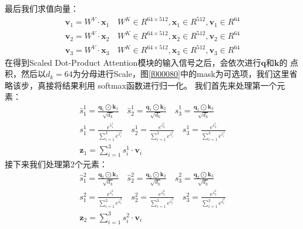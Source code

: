 \documentclass{article}
\begin{document}
最后我们求值向量：
\begin{equation}
\begin{aligned}
\boldsymbol{v}_{1} = W^{V} \cdot \boldsymbol{x}_1 \quad W^{K} \in R^{64 \times 512}, 
\boldsymbol{x}_1 \in R^{512}, \boldsymbol{v}_1 \in R^{64} \\
\boldsymbol{v}_{2} = W^{V} \cdot \boldsymbol{x}_2 \quad W^{K} \in R^{64 \times 512}, 
\boldsymbol{x}_2 \in R^{512}, \boldsymbol{v}_2 \in R^{64} \\
\boldsymbol{v}_{3} = W^{V} \cdot \boldsymbol{x}_3 \quad W^{K} \in R^{64 \times 512}, 
\boldsymbol{x}_3 \in R^{512}, \boldsymbol{v}_3 \in R^{64} 
\end{aligned}
\label{e000108}
\end{equation}
在得到Scaled Dot-Product Attention模块的输入信号之后，会依次进行$\boldsymbol{q}$和$\boldsymbol{k}$的
点积，然后以$d_{k}=64$为分母进行Scale，图\ref{f000080}中的mask为可选项，我们这里省略该步，真接将结果利用
softmax函数进行归一化。
我们首先来处理第一个元素：
\begin{equation}
\begin{aligned}
\hat{s}_{1}^{1} = \frac{ \boldsymbol{q}_1 \bigodot \boldsymbol{k}_1 }{ \sqrt{d_{k}} } \quad 
\hat{s}_{2}^{1} = \frac{ \boldsymbol{q}_1 \bigodot \boldsymbol{k}_2 }{ \sqrt{d_{k}} } \quad 
\hat{s}_{3}^{1} = \frac{ \boldsymbol{q}_1 \bigodot \boldsymbol{k}_3 }{ \sqrt{d_{k}} } \\
s_{1}^{1} = \frac{ e^{\hat{s}_{1}^{1}} }{ \sum_{i=1}^{3} e^{\hat{s}_{i}^{1}} } \quad 
s_{2}^{1} = \frac{ e^{\hat{s}_{2}^{1}} }{ \sum_{i=1}^{3} e^{\hat{s}_{i}^{1}} } \quad 
s_{3}^{1} = \frac{ e^{\hat{s}_{3}^{1}} }{ \sum_{i=1}^{3} e^{\hat{s}_{i}^{1}} } \\
\boldsymbol{z}_{1} = \sum_{i=1}^{3} s_{i}^{1} \cdot \boldsymbol{v}_i
\end{aligned}
\label{e000109}
\end{equation}
接下来我们处理第2个元素：
\begin{equation}
\begin{aligned}
\hat{s}_{1}^{2} = \frac{ \boldsymbol{q}_2 \bigodot \boldsymbol{k}_1 }{ \sqrt{d_{k}} } \quad 
\hat{s}_{2}^{2} = \frac{ \boldsymbol{q}_2 \bigodot \boldsymbol{k}_2 }{ \sqrt{d_{k}} } \quad 
\hat{s}_{3}^{2} = \frac{ \boldsymbol{q}_2 \bigodot \boldsymbol{k}_3 }{ \sqrt{d_{k}} } \\
s_{1}^{2} = \frac{ e^{\hat{s}_{1}^{2}} }{ \sum_{i=1}^{3} e^{\hat{s}_{i}^{2}} } \quad 
s_{2}^{2} = \frac{ e^{\hat{s}_{2}^{2}} }{ \sum_{i=1}^{3} e^{\hat{s}_{i}^{2}} } \quad 
s_{3}^{2} = \frac{ e^{\hat{s}_{3}^{2}} }{ \sum_{i=1}^{3} e^{\hat{s}_{i}^{2}} } \\
\boldsymbol{z}_{2} = \sum_{i=1}^{3} s_{i}^{2} \cdot \boldsymbol{v}_i
\end{aligned}
\label{e000110}
\end{equation}
\end{document}
